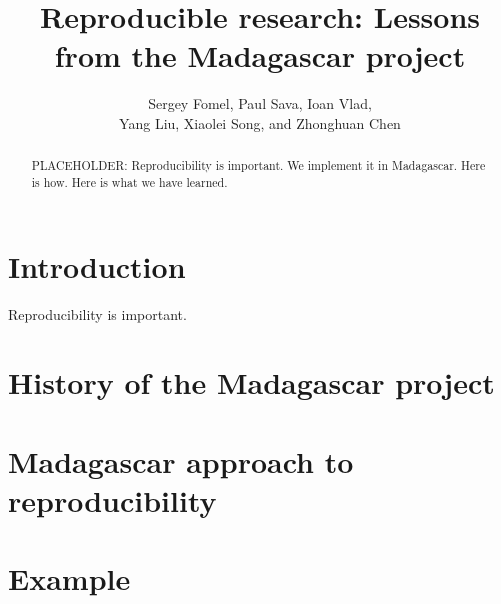 \title{Reproducible research: Lessons from the Madagascar project}


\author{
Sergey Fomel\footnotemark[1],
Paul Sava\footnotemark[2],
Ioan Vlad\footnotemark[3], \\
Yang Liu\footnotemark[4],
Xiaolei Song\footnotemark[1], and
Zhonghuan Chen\footnotemark[5]
}

\address{
\footnotemark[1]Bureau of Economic Geology \\
Jackson School of Geosciences \\
The University of Texas at Austin \\
University Station, Box X \\
Austin, TX 78713-8972 \\
USA \\
\footnotemark[2] Department of Geophysics \\
Colorado School of Mines \\
Golden, CO 80401 \\
USA
\footnotemark[3] TGS \\
2500 CityWest Boulevard, Suite 2000 \\
Houston, Texas 77042
USA
}

\begin{abstract}
PLACEHOLDER: Reproducibility is important. We implement it in Madagascar. Here is how. Here is what we have learned.
\end{abstract}

\section{Introduction}

Reproducibility is important.

\section{History of the Madagascar project}

\section{Madagascar approach to reproducibility}

\section{Example}

